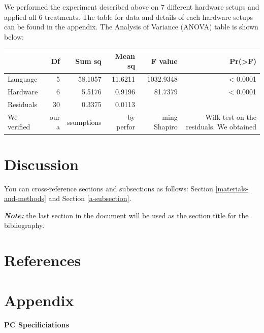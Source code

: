 \documentclass[12pt,halfline,a4paper,]{ouparticle}
\begin{document}
We performed the experiment described above on 7 different hardware
setups and applied all 6 treatments. The table for data and details of
each hardware setups can be found in the appendix. The Analysis of
Variance (ANOVA) table is shown below:

\begin{longtable}[]{@{}lrrrrr@{}}
\toprule\noalign{}
& Df & Sum sq & Mean sq & F value & Pr(\textgreater F) \\
\midrule\noalign{}
\endhead
\bottomrule\noalign{}
\endlastfoot
Language & 5 & 58.1057 & 11.6211 & 1032.9348 & \textless{} 0.0001 \\
Hardware & 6 & 5.5176 & 0.9196 & 81.7379 & \textless{} 0.0001 \\
Residuals & 30 & 0.3375 & 0.0113 & & \\
We verified & our a & ssumptions & by perfor & ming Shapiro & Wilk test
on the residuals. We obtained \\
\end{longtable}

\section{Discussion}\label{discussion}

You can cross-reference sections and subsections as follows: Section
\ref{materials-and-methods} and Section \ref{a-subsection}.

\textbf{\emph{Note:}} the last section in the document will be used as
the section title for the bibliography.

\section{References}\label{references}

\section{Appendix}\label{appendix}

\paragraph{PC Specificiations}\label{pc-specificiations}

\hfill\break
\end{document}
